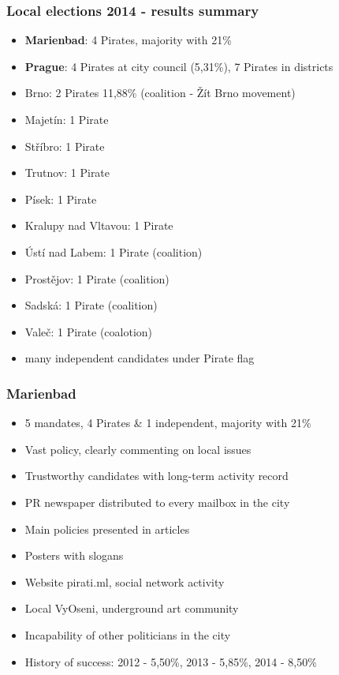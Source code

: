 \begin{frame}
	\frametitle{Local elections 2014 - results summary}
	\begin{itemize}
	\item \textbf{Marienbad}: 4 Pirates, majority with 21\%
	\item \textbf{Prague}: 4 Pirates at city council (5,31\%), 7 Pirates in districts
	\item Brno: 2 Pirates 11,88\% (coalition - \v{Z}\'it Brno movement)
	\item Majet\'in: 1 Pirate
	\item St\v{r}\'ibro: 1 Pirate
	\item Trutnov: 1 Pirate
	\item P\'isek: 1 Pirate
	\item Kralupy nad Vltavou: 1 Pirate
	\item \'Ust\'i nad Labem: 1 Pirate (coalition)
	\item Prost\v{e}jov: 1 Pirate (coalition)
	\item Sadsk\'a: 1 Pirate (coalition)
	\item Vale\v{c}: 1 Pirate (coalotion)
	\item many independent candidates under Pirate flag
\end{itemize}
\end{frame}
\begin{frame}
	\frametitle{Marienbad}
	\begin{itemize}
	\item 5 mandates, 4 Pirates \& 1 independent, majority with 21\%
	\item Vast policy, clearly commenting on local issues
	\item Trustworthy candidates with long-term activity record
	\item PR newspaper distributed to every mailbox in the city
	\item Main policies presented in articles
	\item Posters with slogans
	\item Website pirati.ml, social network activity
	\item Local VyOseni, underground art community
	\item Incapability of other politicians in the city
	\item History of success: 2012 - 5,50\%, 2013 - 5,85\%, 2014 - 8,50\%
	\end{itemize}
\end{frame}

